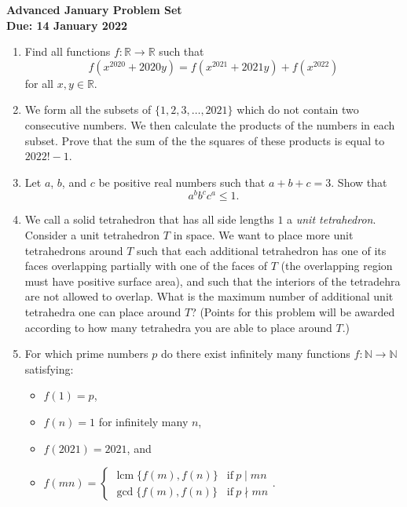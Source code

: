 \documentclass{article}
\DeclareMathOperator{\lcm}{lcm}
\begin{document}
\thispagestyle{empty}

\begin{center}
  \textbf{\Large Advanced January Problem Set}
  \\ \vspace{1em}
  \textbf{\large Due: 14 January 2022}
\end{center}

\bigskip

\begin{enumerate}[itemsep=\fill]

\item %
Find all functions $f : \mathbb{R} \to \mathbb{R}$ such that
\[ f(x^{2020} +2020y) = f(x^{2021} +2021y) +f(x^{2022}) \]
for all $x,y \in \mathbb{R}$.


\item %
We form all the subsets of $\{1, 2, 3, \dotsc, 2021\}$ which do not contain two consecutive numbers.
We then calculate the products of the numbers in each subset.
Prove that the sum of the the squares of these products is equal to $2022! -1$.


\item %
Let $a$, $b$, and $c$ be positive real numbers such that $a+b+c = 3$.
Show that
\[ a^b b^c c^a \leq 1. \]


\item %
We call a solid tetrahedron that has all side lengths $1$ a \emph{unit tetrahedron}.
Consider a unit tetrahedron $T$ in space.
We want to place more unit tetrahedrons around $T$ such that each additional tetrahedron has one of its faces overlapping partially with one of the faces of $T$ (the overlapping region must have positive surface area), and such that the interiors of the tetradehra are not allowed to overlap.
What is the maximum number of additional unit tetrahedra one can place around $T$?
(Points for this problem will be awarded according to how many tetrahedra you are able to place around $T$.)


\item %
For which prime numbers $p$ do there exist infinitely many functions $f : \mathbb{N} \to \mathbb{N}$ satisfying:
\begin{itemize}
	\item $f(1) = p$,
	\item $f(n) = 1$ for infinitely many $n$,
	\item $f(2021) = 2021$, and
	\item $f(mn) = \begin{cases}
		\lcm\{f(m),f(n)\} & \text{if}\ p \mid mn \\
		\gcd\{f(m),f(n)\} & \text{if}\ p \nmid mn
	\end{cases}$.
\end{itemize}



\end{enumerate}
\end{document}
